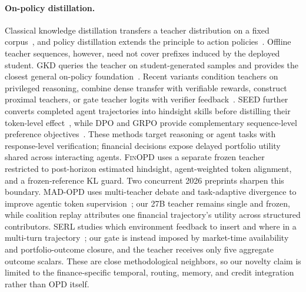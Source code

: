 \paragraph{On-policy distillation.}
Classical knowledge distillation transfers a teacher distribution on a fixed corpus~\cite{hinton2015distilling}, and policy distillation extends the principle to action policies~\cite{rusu2015policy}. Offline teacher sequences, however, need not cover prefixes induced by the deployed student. GKD queries the teacher on student-generated samples and provides the closest general on-policy foundation~\cite{gkd2024}. Recent variants condition teachers on privileged reasoning, combine dense transfer with verifiable rewards, construct proximal teachers, or gate teacher logits with verifier feedback~\cite{selfdistilledreasoner2026,rlsd2026,topd2026,rgopd2026}. SEED further converts completed agent trajectories into hindsight skills before distilling their token-level effect~\cite{seed2026}, while DPO and GRPO provide complementary sequence-level preference objectives~\cite{dpo2023,grpo2024}. These methods target reasoning or agent tasks with response-level verification; financial decisions expose delayed portfolio utility shared across interacting agents. \textsc{FinOPD} uses a separate frozen teacher restricted to post-horizon estimated hindsight, agent-weighted token alignment, and a frozen-reference KL guard.
Two concurrent 2026 preprints sharpen this boundary. MAD-OPD uses multi-teacher debate and task-adaptive divergence to improve agentic token supervision~\cite{wang2026madopd}; our 27B teacher remains single and frozen, while coalition replay attributes one financial trajectory's utility across structured contributors. SERL studies which environment feedback to insert and where in a multi-turn trajectory~\cite{li2026selective}; our gate is instead imposed by market-time availability and portfolio-outcome closure, and the teacher receives only five aggregate outcome scalars. These are close methodological neighbors, so our novelty claim is limited to the finance-specific temporal, routing, memory, and credit integration rather than OPD itself.
\endgroup
